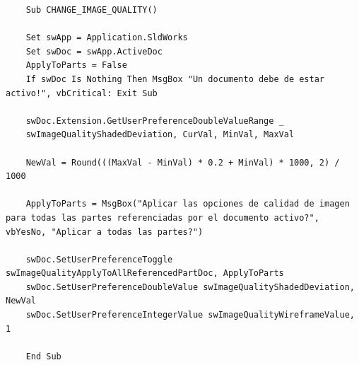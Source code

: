 \documentclass{report}
\begin{document}
\begin{lstlisting}
	Sub CHANGE_IMAGE_QUALITY()
	
	Set swApp = Application.SldWorks
	Set swDoc = swApp.ActiveDoc
	ApplyToParts = False
	If swDoc Is Nothing Then MsgBox "Un documento debe de estar activo!", vbCritical: Exit Sub
	
	swDoc.Extension.GetUserPreferenceDoubleValueRange _
	swImageQualityShadedDeviation, CurVal, MinVal, MaxVal
	
	NewVal = Round(((MaxVal - MinVal) * 0.2 + MinVal) * 1000, 2) / 1000
	
	ApplyToParts = MsgBox("Aplicar las opciones de calidad de imagen para todas las partes referenciadas por el documento activo?", vbYesNo, "Aplicar a todas las partes?")
	
	swDoc.SetUserPreferenceToggle swImageQualityApplyToAllReferencedPartDoc, ApplyToParts
	swDoc.SetUserPreferenceDoubleValue swImageQualityShadedDeviation, NewVal
	swDoc.SetUserPreferenceIntegerValue swImageQualityWireframeValue, 1
	
	End Sub
\end{lstlisting}
\end{document}
